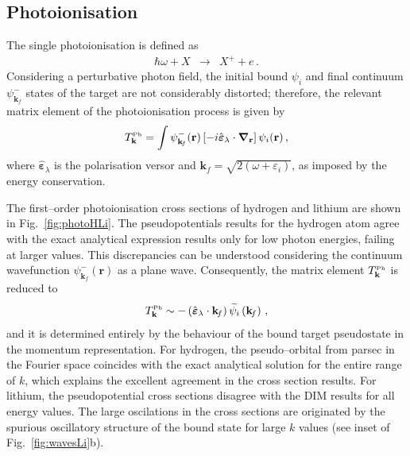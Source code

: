 \documentclass[10pt]{article}
\begin{document}
\subsection{Photoionisation}
\label{sec:photo}

The single photoionisation is defined as
\begin{eqnarray}
 \hbar\omega + X &\rightarrow& X^+ + e\,.
\end{eqnarray}
Considering a perturbative photon field, the initial bound $\psi_{i}$ 
and final continuum $\psi_{\mathbf{k}_{\!f}}^-$ states of the target are
not considerably distorted; therefore, the relevant matrix element of the 
photoionisation process is given by
\begin{equation}
 T_{\mathbf{k}}^{\mbox{\tiny Ph}} = \int{
 \psi_{\mathbf{k}_{\!f}}^-(\mathbf{r}) 
 \left[-i \hat{\boldsymbol{\varepsilon}}_\lambda \cdot 
 \boldsymbol{\nabla}_\mathbf{r}\right] 
 \psi_{i}(\mathbf{r})}\,,
\end{equation}
where $\hat{\boldsymbol{\varepsilon}}_\lambda$ is the polarisation 
versor and $\mathbf{k}_{\!f}=\sqrt{2(\omega+\varepsilon_i)}$, as imposed 
by the energy conservation.

The first--order photoionisation cross sections of hydrogen and 
lithium are shown in Fig.~\ref{fig:photoHLi}. The pseudopotentials 
results for the hydrogen atom agree with the exact analytical 
expression results only for low photon energies, failing at larger values. 
This discrepancies can be understood considering the continuum 
wavefunction $\psi_{\mathbf{k}_{\!f}}^-(\mathbf{r})$ as a plane wave. 
Consequently, the matrix element $T_{\mathbf{k}}^{\mbox{\tiny Ph}}$ 
is reduced to
\begin{equation}
 T_{\mathbf{k}}^{\mbox{\tiny Ph}} \sim 
 -\left(\hat{\boldsymbol{\varepsilon}}_\lambda \cdot \mathbf{k}_{\!f} \right)
 \widetilde{\psi_i} \left(\mathbf{k}_{\!f}\right)\,,
\end{equation}
and it is determined entirely by the behaviour of the bound target 
pseudostate in the momentum representation. For hydrogen, the 
pseudo--orbital from {\sc parsec} in the Fourier space coincides with 
the exact 
analytical solution for the entire range of $k$, which explains the 
excellent agreement in the cross section results.
For lithium, the pseudopotential cross sections disagree with the DIM 
results for all energy values. The large oscilations in the cross sections
are originated by the spurious oscillatory structure of the bound state
for large  $k$ values (see inset of Fig.~\ref{fig:wavesLi}b).
\end{document}
